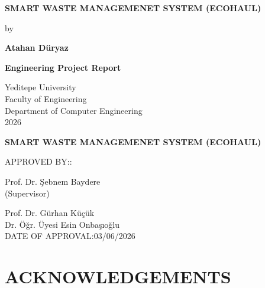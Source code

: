 \documentclass[12pt,a4paper]{report}
\begin{document}

\begin{titlepage}
\thispagestyle{empty}
\centering
\vspace*{2cm}
{\large\bfseries
SMART WASTE MANAGEMENET SYSTEM
(ECOHAUL)\par}
\vspace{4cm}
{\normalsize by
\\[0.4cm]}
{\large\bfseries Atahan Düryaz\par}
\vspace{4cm}
{\large\bfseries Engineering Project Report
\par}
\vspace{3cm}
{\normalsize
Yeditepe University\\
Faculty of Engineering\\
Department of Computer Engineering\\
2026\par}
\end{titlepage}

\clearpage\thispagestyle{empty}\phantom{x}\clearpage
\setcounter{page}{2}

\thispagestyle{plain}
\begin{center}
{\large\bfseries
SMART WASTE MANAGEMENET SYSTEM (ECOHAUL)\par}
\end{center}
\vspace{2cm}
\noindent APPROVED BY::
\vspace{1.2cm}

\noindent Prof. Dr. \c{S}ebnem Baydere \dotfill\\
(Supervisor)

\vspace{0.9cm}
\noindent Prof. Dr. Gürhan Küçük \dotfill\\


\vspace{0.9cm}
\noindent  Dr. Öğr. Üyesi Esin Onba\c{s}{\i}o\u{g}lu \dotfill\\


\vfill
\noindent DATE OF APPROVAL:03/06/2026
\clearpage

\chapter*{ACKNOWLEDGEMENTS}
\end{document}
